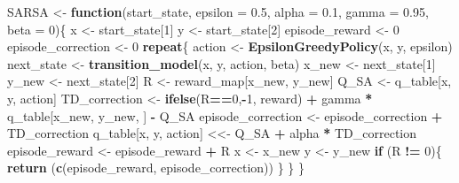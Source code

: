 \documentclass[
]{article}
\newenvironment{Shaded}{\begin{snugshade}}{\end{snugshade}}
\newcommand{\AttributeTok}[1]{\textcolor[rgb]{0.13,0.29,0.53}{#1}}
\newcommand{\ControlFlowTok}[1]{\textcolor[rgb]{0.13,0.29,0.53}{\textbf{#1}}}
\newcommand{\DecValTok}[1]{\textcolor[rgb]{0.00,0.00,0.81}{#1}}
\newcommand{\FloatTok}[1]{\textcolor[rgb]{0.00,0.00,0.81}{#1}}
\newcommand{\FunctionTok}[1]{\textcolor[rgb]{0.13,0.29,0.53}{\textbf{#1}}}
\newcommand{\NormalTok}[1]{#1}
\newcommand{\OtherTok}[1]{\textcolor[rgb]{0.56,0.35,0.01}{#1}}
\newcommand{\SpecialCharTok}[1]{\textcolor[rgb]{0.81,0.36,0.00}{\textbf{#1}}}
\begin{document}
\begin{Shaded}
\begin{Highlighting}[]
\NormalTok{SARSA }\OtherTok{\textless{}{-}} \ControlFlowTok{function}\NormalTok{(start\_state, }\AttributeTok{epsilon =} \FloatTok{0.5}\NormalTok{, }\AttributeTok{alpha =} \FloatTok{0.1}\NormalTok{, }\AttributeTok{gamma =} \FloatTok{0.95}\NormalTok{, }\AttributeTok{beta =} \DecValTok{0}\NormalTok{)\{}
\NormalTok{  x }\OtherTok{\textless{}{-}}\NormalTok{ start\_state[}\DecValTok{1}\NormalTok{]}
\NormalTok{  y }\OtherTok{\textless{}{-}}\NormalTok{ start\_state[}\DecValTok{2}\NormalTok{]}
\NormalTok{  episode\_reward }\OtherTok{\textless{}{-}} \DecValTok{0}
\NormalTok{  episode\_correction }\OtherTok{\textless{}{-}} \DecValTok{0}
  \ControlFlowTok{repeat}\NormalTok{\{}
\NormalTok{    action }\OtherTok{\textless{}{-}} \FunctionTok{EpsilonGreedyPolicy}\NormalTok{(x, y, epsilon)}
\NormalTok{    next\_state }\OtherTok{\textless{}{-}} \FunctionTok{transition\_model}\NormalTok{(x, y, action, beta)}
\NormalTok{    x\_new }\OtherTok{\textless{}{-}}\NormalTok{ next\_state[}\DecValTok{1}\NormalTok{]}
\NormalTok{    y\_new }\OtherTok{\textless{}{-}}\NormalTok{ next\_state[}\DecValTok{2}\NormalTok{]}
\NormalTok{    R }\OtherTok{\textless{}{-}}\NormalTok{ reward\_map[x\_new, y\_new]}
\NormalTok{    Q\_SA }\OtherTok{\textless{}{-}}\NormalTok{ q\_table[x, y, action]}
\NormalTok{    TD\_correction }\OtherTok{\textless{}{-}} \FunctionTok{ifelse}\NormalTok{(R}\SpecialCharTok{==}\DecValTok{0}\NormalTok{,}\SpecialCharTok{{-}}\DecValTok{1}\NormalTok{, reward) }\SpecialCharTok{+}\NormalTok{ gamma }\SpecialCharTok{*}\NormalTok{ q\_table[x\_new, y\_new, ] }\SpecialCharTok{{-}}\NormalTok{ Q\_SA}
\NormalTok{    episode\_correction }\OtherTok{\textless{}{-}}\NormalTok{ episode\_correction }\SpecialCharTok{+}\NormalTok{ TD\_correction}
\NormalTok{    q\_table[x, y, action] }\OtherTok{\textless{}\textless{}{-}}\NormalTok{ Q\_SA }\SpecialCharTok{+}\NormalTok{ alpha }\SpecialCharTok{*}\NormalTok{ TD\_correction}
\NormalTok{    episode\_reward }\OtherTok{\textless{}{-}}\NormalTok{ episode\_reward }\SpecialCharTok{+}\NormalTok{ R}
\NormalTok{    x }\OtherTok{\textless{}{-}}\NormalTok{ x\_new}
\NormalTok{    y }\OtherTok{\textless{}{-}}\NormalTok{ y\_new}
    \ControlFlowTok{if}\NormalTok{ (R }\SpecialCharTok{!=} \DecValTok{0}\NormalTok{)\{}
      \FunctionTok{return}\NormalTok{ (}\FunctionTok{c}\NormalTok{(episode\_reward, episode\_correction))}
\NormalTok{    \}}
\NormalTok{  \}}
\NormalTok{\}}



\end{Highlighting}
\end{Shaded}
\end{document}
